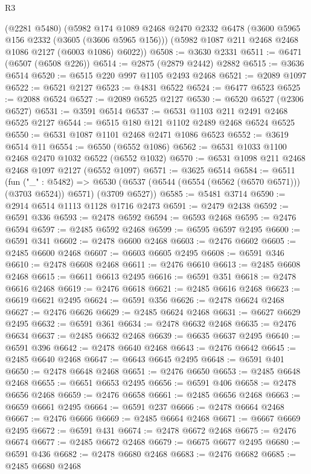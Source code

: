 \begin{lexlean}{R3}
\begin{coremodule}
    (@2281 @5480)
    (@5982
      @174
      @1089
      @2468
      @2470
      @2332
      @6478
      (@3600 @5965 @156 @2332 (@3605 (@3606 @5965 @156)))
      (@5982 @1087 @211 @2468 @2468 @1086 @2127 (@6003 @1086) @6022))
@6508 := @3630 @2331
@6511 := @6471 (@6507 (@6508 @226))
@6514 := @2875 (@2879 @2442) @2882
@6515 := @3636 @6514
@6520 := @6515 @220 @997 @1105 @2493 @2468
@6521 := @2089 @1097
@6522 := @6521 @2127
@6523 := @4831 @6522
@6524 := @6477 @6523
@6525 := @2088 @6524
@6527 := @2089 @6525 @2127
@6530 := @6520 @6527 (@2306 @6527)
@6531 := @3591 @6514
@6537 := @6531 @1103 @211 @2491 @2468 @6525 @2127
@6544 := @6515 @180 @121 @1102 @2489 @2468 @6524 @6525
@6550 := @6531 @1087 @1101 @2468 @2471 @1086 @6523
@6552 := @3619 @6514 @11
@6554 := @6550 (@6552 @1086)
@6562 := @6531 @1033 @1100 @2468 @2470 @1032 @6522 (@6552 @1032)
@6570 := @6531 @1098 @211 @2468 @2468 @1097 @2127 (@6552 @1097)
@6571 := @3625 @6514
@6584 := @6511
    (fun ("_" : @5482) =>
    @6530 (@6537 (@6544 (@6554 (@6562 (@6570 @6571))) (@3703 @6524)) @6571) (@3709 @6527))
@6585 := @5481 @3714
@6590 := @2914 @6514 @1113 @1128 @1716 @2473
@6591 := @2479 @2438
@6592 := @6591 @336
@6593 := @2478 @6592
@6594 := @6593 @2468
@6595 := @2476 @6594
@6597 := @2485 @6592 @2468
@6599 := @6595 @6597 @2495
@6600 := @6591 @341
@6602 := @2478 @6600 @2468
@6603 := @2476 @6602
@6605 := @2485 @6600 @2468
@6607 := @6603 @6605 @2495
@6608 := @6591 @346
@6610 := @2478 @6608 @2468
@6611 := @2476 @6610
@6613 := @2485 @6608 @2468
@6615 := @6611 @6613 @2495
@6616 := @6591 @351
@6618 := @2478 @6616 @2468
@6619 := @2476 @6618
@6621 := @2485 @6616 @2468
@6623 := @6619 @6621 @2495
@6624 := @6591 @356
@6626 := @2478 @6624 @2468
@6627 := @2476 @6626
@6629 := @2485 @6624 @2468
@6631 := @6627 @6629 @2495
@6632 := @6591 @361
@6634 := @2478 @6632 @2468
@6635 := @2476 @6634
@6637 := @2485 @6632 @2468
@6639 := @6635 @6637 @2495
@6640 := @6591 @396
@6642 := @2478 @6640 @2468
@6643 := @2476 @6642
@6645 := @2485 @6640 @2468
@6647 := @6643 @6645 @2495
@6648 := @6591 @401
@6650 := @2478 @6648 @2468
@6651 := @2476 @6650
@6653 := @2485 @6648 @2468
@6655 := @6651 @6653 @2495
@6656 := @6591 @406
@6658 := @2478 @6656 @2468
@6659 := @2476 @6658
@6661 := @2485 @6656 @2468
@6663 := @6659 @6661 @2495
@6664 := @6591 @237
@6666 := @2478 @6664 @2468
@6667 := @2476 @6666
@6669 := @2485 @6664 @2468
@6671 := @6667 @6669 @2495
@6672 := @6591 @431
@6674 := @2478 @6672 @2468
@6675 := @2476 @6674
@6677 := @2485 @6672 @2468
@6679 := @6675 @6677 @2495
@6680 := @6591 @436
@6682 := @2478 @6680 @2468
@6683 := @2476 @6682
@6685 := @2485 @6680 @2468

\end{coremodule}
\end{lexlean}
